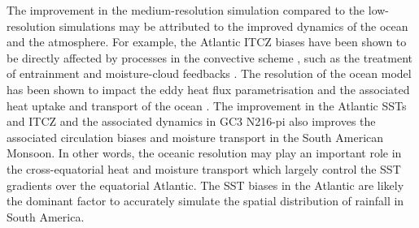 The improvement in the medium-resolution simulation compared to the low-resolution simulations may  be attributed to the improved dynamics of the ocean and the atmosphere. %
For example, the Atlantic ITCZ biases have been shown to be directly affected by processes in the convective scheme \citep{bellucci2010}, such as the treatment of entrainment and moisture-cloud feedbacks \citep{oueslati2013,li2014}. 
The resolution of the ocean model has been shown to impact the eddy heat flux parametrisation and the associated heat uptake and transport of the ocean  \citep{kuhlbrodt2018}. The improvement in the Atlantic SSTs and ITCZ and the associated dynamics in GC3 N216-pi also improves the associated circulation biases and moisture transport in the South American Monsoon. In other words, the oceanic resolution may play an important role in the cross-equatorial heat and moisture transport which largely control the SST gradients over the equatorial Atlantic. The SST biases in the Atlantic are likely the dominant factor to accurately simulate the spatial distribution of rainfall in South America.



